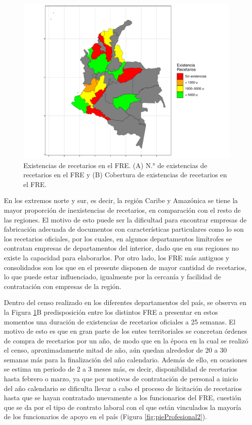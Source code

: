 \documentclass[
]{book}
\begin{document}
\begin{figure}

{\centering \includegraphics[width=1\linewidth]{InformeFinal_files/figure-latex/existenciasRecetarios-1} 

}

\caption{Existencias de recetarios en el FRE. (A) N.° de existencias de recetarios en el FRE y (B) Cobertura de existencias de recetarios en el FRE.}\label{fig:existenciasRecetarios}
\end{figure}

En los extremos norte y sur, es decir, la región Caribe y Amazónica se tiene la mayor proporción de inexistencias de recetarios, en comparación con el resto de las regiones. El motivo de esto puede ser la dificultad para encontrar empresas de fabricación adecuada de documentos con características particulares como lo son los recetarios oficiales, por los cuales, en algunos departamentos limítrofes se contratan empresas de departamentos del interior, dado que en sus regiones no existe la capacidad para elaborarlos. Por otro lado, los FRE más antiguos y consolidados son los que en el presente disponen de mayor cantidad de recetarios, lo que puede estar influenciado, igualmente por la cercanía y facilidad de contratación con empresas de la región.

Dentro del censo realizado en los diferentes departamentos del país, se observa en la Figura \ref{fig:existenciasRecetarios}B predisposición entre los distintos FRE a presentar en estos momentos una duración de existencias de recetarios oficiales a 25 semanas. El motivo de esto es que en gran parte de los entes territoriales se concretan órdenes de compra de recetarios por un año, de modo que en la época en la cual se realizó el censo, aproximadamente mitad de año, aún quedan alrededor de 20 a 30 semanas más para la finalización del año calendario. Además de ello, en ocasiones se estima un periodo de 2 a 3 meses más, es decir, disponibilidad de recetarios hasta febrero o marzo, ya que por motivos de contratación de personal a inicio del año calendario se dificulta llevar a cabo el proceso de licitación de recetarios hasta que se hayan contratado nuevamente a los funcionarios del FRE, cuestión que se da por el tipo de contrato laboral con el que están vinculados la mayoría de los funcionarios de apoyo en el país (Figura \ref{fig:pieProfesional2}).
\end{document}

